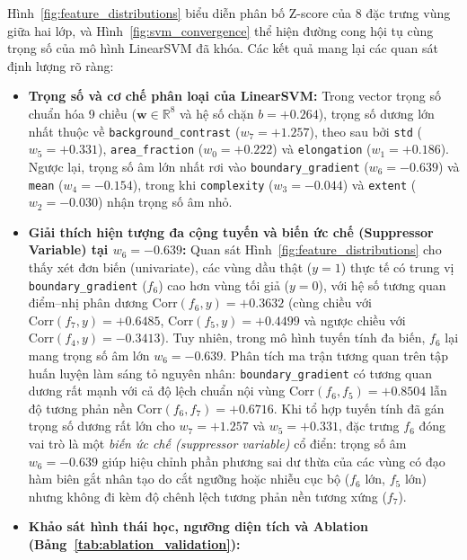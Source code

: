 Hình~\ref{fig:feature_distributions} biểu diễn phân bố Z-score của 8 đặc trưng vùng giữa hai lớp, và Hình~\ref{fig:svm_convergence} thể hiện đường cong hội tụ cùng trọng số của mô hình LinearSVM đã khóa. Các kết quả mang lại các quan sát định lượng rõ ràng:
\begin{itemize}
    \item \textbf{Trọng số và cơ chế phân loại của LinearSVM:} Trong vector trọng số chuẩn hóa 9 chiều ($\mathbf{w} \in \mathbb{R}^8$ và hệ số chặn $b = +0.264$), trọng số dương lớn nhất thuộc về \texttt{background\_contrast} ($w_7 = +1.257$), theo sau bởi \texttt{std} ($w_5 = +0.331$), \texttt{area\_fraction} ($w_0 = +0.222$) và \texttt{elongation} ($w_1 = +0.186$). Ngược lại, trọng số âm lớn nhất rơi vào \texttt{boundary\_gradient} ($w_6 = -0.639$) và \texttt{mean} ($w_4 = -0.154$), trong khi \texttt{complexity} ($w_3 = -0.044$) và \texttt{extent} ($w_2 = -0.030$) nhận trọng số âm nhỏ.
    \item \textbf{Giải thích hiện tượng đa cộng tuyến và biến ức chế (Suppressor Variable) tại $w_6 = -0.639$:} Quan sát Hình~\ref{fig:feature_distributions} cho thấy xét đơn biến (univariate), các vùng dầu thật ($y=1$) thực tế có trung vị \texttt{boundary\_gradient} ($f_6$) cao hơn vùng tối giả ($y=0$), với hệ số tương quan điểm--nhị phân dương $\mathrm{Corr}(f_6, y) = +0.3632$ (cùng chiều với $\mathrm{Corr}(f_7, y) = +0.6485$, $\mathrm{Corr}(f_5, y) = +0.4499$ và ngược chiều với $\mathrm{Corr}(f_4, y) = -0.3413$). Tuy nhiên, trong mô hình tuyến tính đa biến, $f_6$ lại mang trọng số âm lớn $w_6 = -0.639$. Phân tích ma trận tương quan trên tập huấn luyện làm sáng tỏ nguyên nhân: \texttt{boundary\_gradient} có tương quan dương rất mạnh với cả độ lệch chuẩn nội vùng $\mathrm{Corr}(f_6, f_5) = +0.8504$ lẫn độ tương phản nền $\mathrm{Corr}(f_6, f_7) = +0.6716$. Khi tổ hợp tuyến tính đã gán trọng số dương rất lớn cho $w_7 = +1.257$ và $w_5 = +0.331$, đặc trưng $f_6$ đóng vai trò là một \textit{biến ức chế (suppressor variable)} cổ điển: trọng số âm $w_6 = -0.639$ giúp hiệu chỉnh phần phương sai dư thừa của các vùng có đạo hàm biên gắt nhân tạo do cắt ngưỡng hoặc nhiễu cục bộ ($f_6$ lớn, $f_5$ lớn) nhưng không đi kèm độ chênh lệch tương phản nền tương xứng ($f_7$).
    \item \textbf{Khảo sát hình thái học, ngưỡng diện tích và Ablation (Bảng~\ref{tab:ablation_validation}):}
    \begin{enumerate}

\end{enumerate}
\end{itemize}
